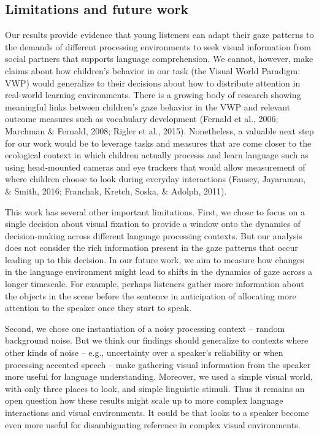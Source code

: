 \documentclass[,man,floatsintext]{apa6}
\begin{document}
\subsection{Limitations and future
work}\label{limitations-and-future-work}

Our results provide evidence that young listeners can adapt their gaze
patterns to the demands of different processing environments to seek
visual information from social partners that supports language
comprehension. We cannot, however, make claims about how children's
behavior in our task (the Visual World Paradigm: VWP) would generalize
to their decisions about how to distribute attention in real-world
learning environments. There is a growing body of research showing
meaningful links between children's gaze behavior in the VWP and
relevant outcome measures such as vocabulary development (Fernald et
al., 2006; Marchman \& Fernald, 2008; Rigler et al., 2015). Nonetheless,
a valuable next step for our work would be to leverage tasks and
measures that are come closer to the ecological context in which
children actually processs and learn language such as using head-mounted
cameras and eye trackers that would allow measurement of where children
choose to look during everyday interactions (Fausey, Jayaraman, \&
Smith, 2016; Franchak, Kretch, Soska, \& Adolph, 2011).

This work has several other important limitations. First, we chose to
focus on a single decision about visual fixation to provide a window
onto the dynamics of decision-making across different language
processing contexts. But our analysis does not consider the rich
information present in the gaze patterns that occur leading up to this
decision. In our future work, we aim to measure how changes in the
language environment might lead to shifts in the dynamics of gaze across
a longer timescale. For example, perhaps listeners gather more
information about the objects in the scene before the sentence in
anticipation of allocating more attention to the speaker once they start
to speak.

Second, we chose one instantiation of a noisy processing context --
random background noise. But we think our findings should generalize to
contexts where other kinds of noise -- e.g., uncertainty over a
speaker's reliability or when processing accented speech -- make
gathering visual information from the speaker more useful for language
understanding. Moreover, we used a simple visual world, with only three
places to look, and simple linguistic stimuli. Thus it remains an open
question how these results might scale up to more complex language
interactions and visual environments. It could be that looks to a
speaker become even more useful for disambiguating reference in complex
visual environments.
\end{document}
